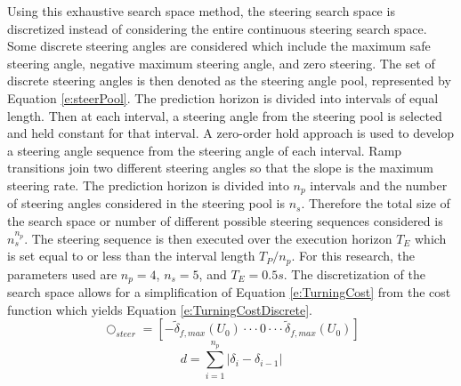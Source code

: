 \documentclass[12pt,onecolumn]{report}
\begin{document}
Using this exhaustive search space method, the steering search space is discretized instead of considering the entire continuous steering search space. Some discrete steering angles are considered which include the maximum safe steering angle, negative maximum steering angle, and zero steering. The set of discrete steering angles is then denoted as the steering angle pool, represented by Equation \ref{e:steerPool}. The prediction horizon is divided into intervals of equal length. Then at each interval, a steering angle from the steering pool is selected and held constant for that interval. A zero-order hold approach is used to develop a steering angle sequence from the steering angle of each interval. Ramp transitions join two different steering angles so that the slope is the maximum steering rate. The prediction horizon is divided into $n_p$ intervals and the number of steering angles considered in the steering pool is $n_s$. Therefore the total size of the search space or number of different possible steering sequences considered is $n_s^{n_p}$. The steering sequence is then executed over the execution horizon $T_E$ which is set equal to or less than the interval length $T_P/n_p$. For this research, the parameters used are $n_p = 4$, $n_s=5$, and $T_E = 0.5s$. The discretization of the search space allows for a simplification of Equation \ref{e:TurningCost} from the cost function which yields Equation \ref{e:TurningCostDiscrete}.
%
\begin{equation}\label{e:steerPool}
\bigcirc_{steer}=[ -\tilde{\delta}_{f,max}\left(U_0\right)\cdot\cdot\cdot 0 \cdot\cdot\cdot \tilde{\delta}_{f,max}\left(U_0\right) ]
\end{equation}
\begin{equation}\label{e:TurningCostDiscrete}
d = \sum\limits_{i=1}^{n_p}|\delta_i -\delta_{i-1}|
\end{equation}
\end{document}
